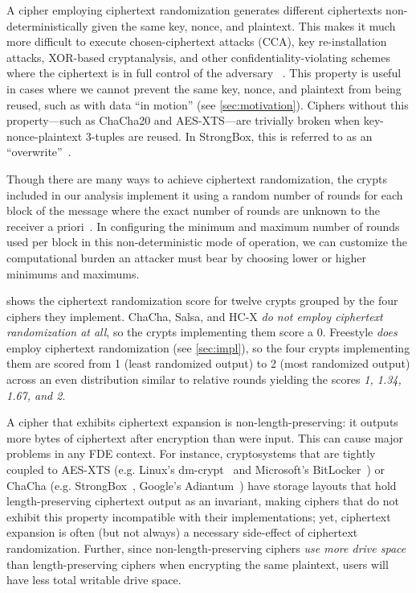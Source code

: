 
 A cipher employing ciphertext
randomization generates different ciphertexts non-deterministically given the
same key, nonce, and plaintext. This makes it much more difficult to execute
chosen-ciphertext attacks (CCA), key re-installation attacks, XOR-based
cryptanalysis, and other confidentiality-violating schemes where the ciphertext
is in full control of the adversary ~\cite{Freestyle}. This property is useful
in cases where we cannot prevent the same key, nonce, and plaintext from being
reused, such as with data ``in motion'' (see \cref{sec:motivation}). Ciphers
without this property---such as ChaCha20 and AES-XTS---are trivially broken when
key-nonce-plaintext 3-tuples are reused. In StrongBox, this is referred to as an
``overwrite''~\cite{StrongBox}.

Though there are many ways to achieve ciphertext randomization, the crypts
included in our analysis implement it using a random number of rounds for each
block of the message where the exact number of rounds are unknown to the
receiver a priori~\cite{Freestyle}. In configuring the minimum and maximum
number of rounds used per block in this non-deterministic mode of operation, we
can customize the computational burden an attacker must bear by choosing lower
or higher minimums and maximums.

 shows the ciphertext randomization score for twelve crypts
grouped by the four ciphers they implement. ChaCha, Salsa, and HC-X {\em do not
employ ciphertext randomization at all}, so the crypts implementing them score a
0. Freestyle {\em does} employ ciphertext randomization (see \cref{sec:impl}),
so the four crypts implementing them are scored from 1 (least randomized output)
to 2 (most randomized output) across an even distribution similar to relative
rounds yielding the scores {\em 1, 1.34, 1.67, and 2}.


 A cipher that exhibits ciphertext
expansion is non-length-preserving: it outputs more bytes of ciphertext after
encryption than were input. This can cause major problems in any FDE context.
For instance, cryptosystems that are tightly coupled to AES-XTS (e.g. Linux's
dm-crypt~\cite{dmcrypt} and Microsoft's BitLocker~\cite{bitlocker1}) or ChaCha
(e.g. StrongBox~\cite{StrongBox}, Google's Adiantum~\cite{Adiantum}) have
storage layouts that hold length-preserving ciphertext output as an invariant,
making ciphers that do not exhibit this property incompatible with their
implementations; yet, ciphertext expansion is often (but not always) a necessary
side-effect of ciphertext randomization. Further, since non-length-preserving
ciphers {\em use more drive space} than length-preserving ciphers when
encrypting the same plaintext, users will have less total writable drive space.

